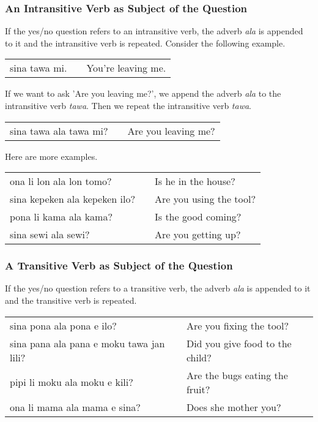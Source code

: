 %
\subsubsection*{An Intransitive Verb as Subject of the Question}
%

If the yes/no question refers to an intransitive verb, the adverb \textit{ala} is appended to it and the intransitive verb is repeated.
Consider the following example.

\begin{supertabular}{p{5,5cm}|ll}
sina tawa mi. &&  You're leaving me. \\
\end{supertabular} 

If we want to ask 'Are you leaving me?', we append the adverb \textit{ala} to the intransitive verb \textit{tawa}.
Then we repeat the intransitive verb \textit{tawa}.

\begin{supertabular}{p{5,5cm}|ll}
sina tawa ala tawa mi? &&  Are you leaving me? \\
\end{supertabular}

Here are more examples.

\begin{supertabular}{p{5,5cm}|ll}
ona li lon ala lon tomo? && Is he in the house? \\
sina kepeken ala kepeken ilo? && Are you using the tool? \\
pona li kama ala kama?  && Is the good coming? \\
sina sewi ala sewi? && Are you getting up? \\
\end{supertabular} 

%
\subsubsection*{A Transitive Verb as Subject of the Question}
%

If the yes/no question refers to a transitive verb, the adverb \textit{ala} is appended to it and the transitive verb is repeated.

\begin{supertabular}{p{5,5cm}|ll}
sina pona ala pona e ilo? && Are you fixing the tool? \\
sina pana ala pana e moku tawa jan lili? && Did you give food to the child? \\
pipi li moku ala moku e kili? && Are the bugs eating the fruit? \\
ona li mama ala mama e sina? && Does she mother you? \\
\end{supertabular} 


